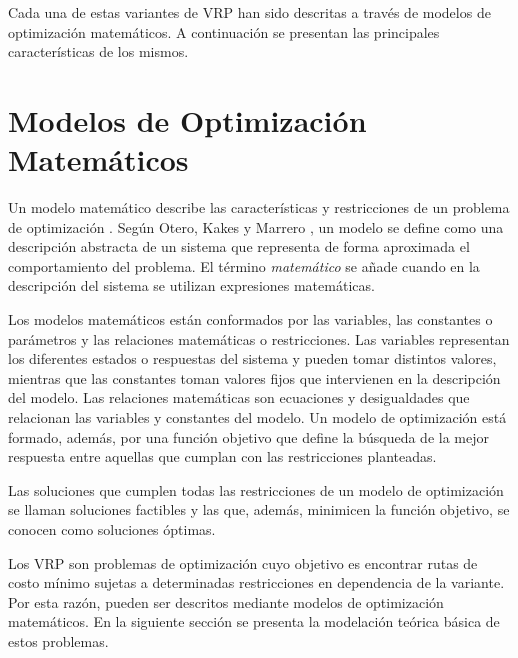 Cada una de estas variantes de VRP han sido descritas a través de modelos de optimización matemáticos. A continuación se presentan las principales características de los mismos.

\section{Modelos de Optimización Matemáticos}\label{sec:models}
Un modelo matemático describe las características y restricciones de un problema de optimización \cite{kallrath@modeling2012}. Según Otero, Kakes y Marrero \cite{modelTextbook}, un modelo se define como una descripción abstracta de un sistema que representa de forma aproximada el comportamiento del problema. El término {\it matemático} se añade cuando en la descripción del sistema se utilizan expresiones matemáticas.

Los modelos matemáticos están conformados por las variables, las constantes o parámetros y las relaciones matemáticas o restricciones. Las variables representan los diferentes estados o respuestas del sistema y pueden tomar distintos valores, mientras que las constantes toman valores fijos que intervienen en la descripción del modelo. Las relaciones matemáticas son ecuaciones y desigualdades que relacionan las variables y constantes del modelo. Un modelo de optimización está formado, además, por una función objetivo que define la búsqueda de la mejor respuesta entre aquellas que cumplan con las restricciones planteadas.

Las soluciones que cumplen todas las restricciones de un modelo de optimización se llaman soluciones factibles y las que, además, minimicen la función objetivo, se conocen como soluciones óptimas.

Los VRP son problemas de optimización cuyo objetivo es encontrar rutas de costo mínimo sujetas a determinadas restricciones en dependencia de la variante. Por esta razón, pueden ser descritos mediante modelos de optimización matemáticos. En la siguiente sección se presenta la modelación teórica básica de estos problemas.

